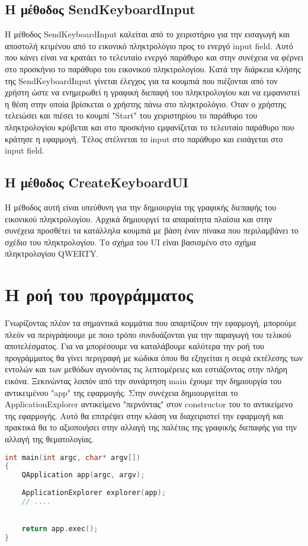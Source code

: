 \subsection{Η μέθοδος SendKeyboardInput}
Η μέθοδος SendKeyboardInput καλείται από το χειριστήριο για την εισαγωγή και αποστολή κειμένου
από το εικονικό πληκτρολόγιο προς το ενεργό input field. Αυτό που κάνει είναι να κρατάει το
τελευταίο ενεργό παράθυρο και στην συνέχεια να φέρνει στο προσκήνιο το παράθυρο του εικονικού
πληκτρολογίου. Κατά την διάρκεια κλήσης της SendKeyboardInput γίνεται έλεγχος για τα κουμπιά
που πιέζονται από τον χρήστη ώστε να ενημερωθεί η γραφική διεπαφή του πληκτρολογίου και να
εμφανιστεί η θέση στην οποία βρίσκεται ο χρήστης πάνω στο πληκτρολόγιο. Όταν ο χρήστης τελειώσει
και πιέσει το κουμπί "Start" του χειριστηρίου το παράθυρο του πληκτρολογίου κρύβεται και στο
προσκήνιο εμφανίζεται το τελευταίο παράθυρο που κράτησε η εφαρμογή. Τέλος στέλνεται το input
στο παράθυρο και εισάγεται στο input field.



\subsection{Η μέθοδος CreateKeyboardUI}

Η μέθοδος αυτή είναι υπεύθυνη για την δημιουργία της γραφικής διεπαφής του εικονικού πληκτρολογίου.
Αρχικά δημιουργεί τα απαραίτητα πλαίσια και στην συνέχεια προσθέτει τα κατάλληλα κουμπιά με βάση
έναν πίνακα που περιλαμβάνει το σχέδιο του πληκτρολογίου. Το σχήμα του UI είναι βασισμένο στο
σχήμα πληκτρολογίου QWERTY.



\section{Η ροή του προγράμματος}
Γνωρίζοντας πλέον τα σημαντικά κομμάτια που απαρτίζουν την εφαρμογή, μπορούμε πλεόν να περιγράψουμε
με ποιο τρόπο συνδυάζονται για την παραγωγή του τελικού αποτελέσματος. Για να μπορέσουμε να καταλάβουμε
καλύτερα την ροή του προγράμματος θα γίνει περιγραφή με κώδικα όπου θα εξηγείται η σειρά εκτέλεσης
των εντολών και των μεθόδων αγνοόντας τις λεπτομέρειες και εστιάζοντας στην πλήρη εικόνα. Ξεκινώντας
λοιπόν από την συνάρτηση main έχουμε την δημιουργία του αντικειμένου "app" της εφαρμογής. Στην συνέχεια
δημιουργείται το ApplicationExplorer αντικείμενο "περνόντας" στον constructor του το αντικείμενο της 
εφαρμογής. Αυτό θα επιτρέψει στην κλάση να διαχειριστεί την εφαρμογή και πρακτικά θα το αξιοποιήσει
στην αλλαγή της παλέτας της γραφικής διεπαφής για την αλλαγή της θεματολογίας. 
\begin{lstlisting}[language=C++, style=cppstyle]
int main(int argc, char* argv[]) 
{
    QApplication app(argc, argv);
    
    ApplicationExplorer explorer(app);
    // ....
    

    return app.exec();
}
\end{lstlisting}

